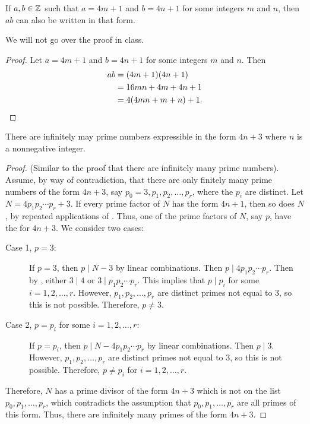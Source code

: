 \documentclass{../ximera}
\begin{document}
\begin{lem*}[Lemma 1.23]\label{lem:prod-goodprimes}
 If $a,b\in\mathbb Z$ such that $a=4m+1$ and $b=4n+1$ for some integers $m$ and $n$, then $ab$ can also be written in that form.
\end{lem*}
We will not go over the proof in class.
\begin{proof}
 Let $a=4m+1$ and $b=4n+1$ for some integers $m$ and $n$. Then 
\begin{align*}
ab&=(4m+1)(4n+1)\\
&=16mn+4m+4n+1\\
&=4(4mn+m+n)+1.\qedhere
\end{align*}
\end{proof}

\begin{prop*}[Proposition 1.22]\label{prop:inf-badprimes}
 There are infinitely may prime numbers expressible in the form $4n+3$ where $n$ is a nonnegative integer.
\end{prop*}
\begin{proof}
 (Similar to the proof that there are infinitely many prime numbers). Assume, by way of contradiction, that there are only finitely many prime numbers of the form $4n+3$, say $p_0=3, p_1,p_2,\dots, p_r$, where the $p_i$ are distinct. Let $N=4p_1 p_2 \cdots p_r+3$. If every prime factor of $N$ has the form $4n+1$, then so does $N$, by repeated applications of . Thus, one of the prime factors of $N$, say $p$, have the for $4n+3$. We consider two cases:
 
\begin{description}
 \item[Case 1, $p=3$:] If $p=3$, then $p\mid N-3$ by linear combinations. Then $p\mid 4 p_1p_2\cdots p_r$. Then by , either $3\mid 4$ or $3\mid p_1p_2\cdots p_r$. This implies that $p\mid p_i$ for some $i=1,2,\dots,r$. However, $p_1,p_2,\dots,p_r$ are distinct primes not equal to $3$, so this is not possible. Therefore, $p\neq 3$.
 
 \item[Case 2, $p=p_i$ for some $i=1,2,\dots, r$:] If $p=p_i$, then $p\mid N-4p_1p_2\cdots p_r$ by linear combinations. Then $p\mid 3$. However, $p_1,p_2,\dots,p_r$ are distinct primes not equal to $3$, so this is not possible. Therefore, $p\neq p_i$ for $i=1,2,\dots,r$.
\end{description}
Therefore, $N$ has a prime divisor of the form $4n+3$ which is not on the list $p_0,p_1,\dots,p_r$, which contradicts the assumption that $p_0,p_1,\dots,p_r$ are all primes of this form. Thus, there are infinitely many primes of the form $4n+3$.
\end{proof}
\end{document}
